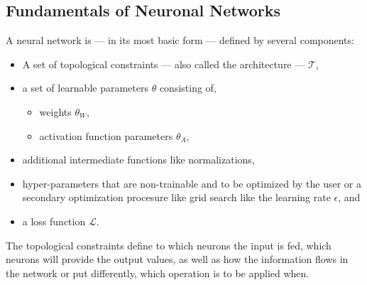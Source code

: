 \subsection{Fundamentals of Neuronal Networks}
A neural network is --- in its most basic form --- defined by several components:
\begin{itemize}
 \item A set of topological constraints --- also called the architecture --- $\mathcal{T}$,
 \item a set of learnable parameters $\theta$ consisting of,
 \begin{itemize}
  \item weights $\theta_W$,
  \item activation function parameters $\theta_A$,
 \end{itemize}
 \item additional intermediate functions like normalizations,
 \item hyper-parameters that are non-trainable and to be optimized by the user or a secondary optimization procesure like grid search like the learning rate $\epsilon$, and
 \item a loss function $\mathcal{L}$.
\end{itemize}
The topological constraints define to which neurons the input is fed, which neurons will provide the output values, as well as how the information flows in the network or put differently, which operation is to be applied when.

